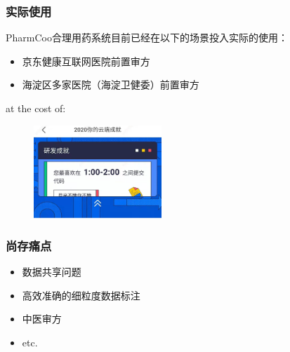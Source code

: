 
\begin{frame}
\frametitle{实际使用}

PharmCoo合理用药系统目前已经在以下的场景投入实际的使用：

\vspace{0.8em}

\begin{itemize}
    \item 京东健康互联网医院前置审方
    \item 海淀区多家医院（海淀卫健委）前置审方
\end{itemize}

\pause
\vspace{1em}

at the cost of:

\begin{figure}
\centering
\includegraphics[width=0.43\textwidth,keepaspectratio]{images/jd_coding_stats.jpg}
\end{figure}

\end{frame}


\begin{frame}
\frametitle{尚存痛点}

\begin{itemize}
    \item 数据共享问题
    \vspace{0.6em}
    \item {\color{green}高效}{\color{pink}准确}的{\color{red}细粒度}数据标注
    \vspace{0.6em}
    \item 中医审方
    \vspace{0.6em}
    \item etc.
\end{itemize}

\end{frame}


